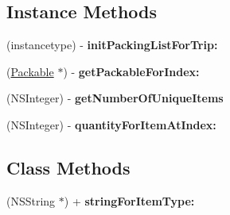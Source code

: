 \subsection*{Instance Methods}
\begin{DoxyCompactItemize}
\item 
\hypertarget{interface_packing_list_ad2a2047f09bda181d360593acb068cab}{(instancetype) -\/ {\bfseries init\-Packing\-List\-For\-Trip\-:}}\label{interface_packing_list_ad2a2047f09bda181d360593acb068cab}

\item 
\hypertarget{interface_packing_list_a09a1d6b99216336d3de2f1d39983e4fd}{(\hyperlink{interface_packable}{Packable} $\ast$) -\/ {\bfseries get\-Packable\-For\-Index\-:}}\label{interface_packing_list_a09a1d6b99216336d3de2f1d39983e4fd}

\item 
\hypertarget{interface_packing_list_abc46addde8828e6e414100851eac731e}{(N\-S\-Integer) -\/ {\bfseries get\-Number\-Of\-Unique\-Items}}\label{interface_packing_list_abc46addde8828e6e414100851eac731e}

\item 
\hypertarget{interface_packing_list_a4b7a74a055c78ad2c84365b9fd2567cd}{(N\-S\-Integer) -\/ {\bfseries quantity\-For\-Item\-At\-Index\-:}}\label{interface_packing_list_a4b7a74a055c78ad2c84365b9fd2567cd}

\end{DoxyCompactItemize}
\subsection*{Class Methods}
\begin{DoxyCompactItemize}
\item 
\hypertarget{interface_packing_list_a2cd4d00da4ed77f1301211b56f4b2f85}{(N\-S\-String $\ast$) + {\bfseries string\-For\-Item\-Type\-:}}\label{interface_packing_list_a2cd4d00da4ed77f1301211b56f4b2f85}

\end{DoxyCompactItemize}
